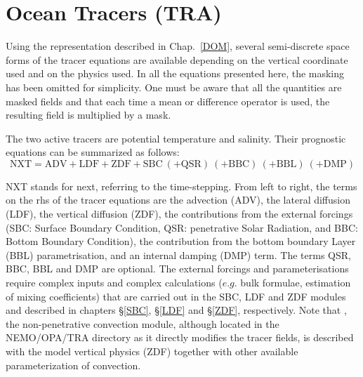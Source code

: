 \documentclass[NEMO_book]{subfiles}
\begin{document}
\chapter{Ocean Tracers (TRA)}
\label{TRA}
\minitoc



\vspace{2.cm}

Using the representation described in Chap.~\ref{DOM}, several semi-discrete 
space forms of the tracer equations are available depending on the vertical 
coordinate used and on the physics used. In all the equations presented 
here, the masking has been omitted for simplicity. One must be aware that 
all the quantities are masked fields and that each time a mean or difference 
operator is used, the resulting field is multiplied by a mask.

The two active tracers are potential temperature and salinity. Their prognostic 
equations can be summarized as follows:
\begin{equation*}
\text{NXT} = \text{ADV}+\text{LDF}+\text{ZDF}+\text{SBC}
                   \ (+\text{QSR})\ (+\text{BBC})\ (+\text{BBL})\ (+\text{DMP})
\end{equation*}

NXT stands for next, referring to the time-stepping. From left to right, the terms 
on the rhs of the tracer equations are the advection (ADV), the lateral diffusion 
(LDF), the vertical diffusion (ZDF), the contributions from the external forcings 
(SBC: Surface Boundary Condition, QSR: penetrative Solar Radiation, and BBC: 
Bottom Boundary Condition), the contribution from the bottom boundary Layer 
(BBL) parametrisation, and an internal damping (DMP) term. The terms QSR, 
BBC, BBL and DMP are optional. The external forcings and parameterisations 
require complex inputs and complex calculations ($e.g.$ bulk formulae, estimation 
of mixing coefficients) that are carried out in the SBC, LDF and ZDF modules and 
described in chapters \S\ref{SBC}, \S\ref{LDF} and  \S\ref{ZDF}, respectively. 
Note that , the non-penetrative convection module, although 
located in the NEMO/OPA/TRA directory as it directly modifies the tracer fields, 
is described with the model vertical physics (ZDF) together with other available 
parameterization of convection.
\end{document}
